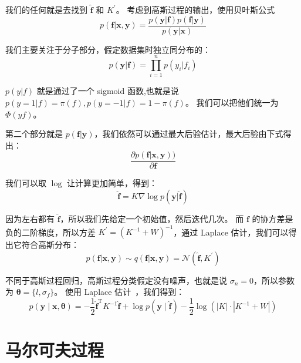 \documentclass[degree=project, degree-type=project]{thuthesis}
\begin{document}
我们的任何就是去找到 $\hat{\boldsymbol{f}}$ 和 $K^\prime$。
考虑到高斯过程的输出，使用贝叶斯公式
\begin{equation}
p(\boldsymbol{f|\boldsymbol{x}, \boldsymbol{y}}) = \frac{p(\boldsymbol{y}|\boldsymbol{f})p(\boldsymbol{f}|\boldsymbol{y})}{p(\boldsymbol{y}|\boldsymbol{x})}
\end{equation}

我们主要关注于分子部分，假定数据集时独立同分布的：
\begin{equation}
p(\boldsymbol{y}|\boldsymbol{f}) = \prod_{i=1}^n p(y_i|f_i)
\end{equation}

$p(y|f)$ 就是通过了一个 sigmoid 函数,也就是说 $p(y=1|f) = \pi(f), p(y=-1|f) = 1 - \pi(f)$。
我们可以把他们统一为 $\Phi(yf)$。

第二个部分就是 $p(\boldsymbol{f}|\boldsymbol{y})$，我们依然可以通过最大后验估计，最大后验由下式得出：
\begin{equation}
\frac{\partial p(\boldsymbol{f}|\boldsymbol{x}, \boldsymbol{y}))}{\partial \boldsymbol{f}}
\end{equation}

我们可以取 $\log$ 让计算更加简单，得到：
\begin{equation}
\hat{\boldsymbol{f}} = K\nabla \log p(\boldsymbol{y}|\hat{\boldsymbol{f}})
\end{equation}

因为左右都有 $\hat{\boldsymbol{f}}$，所以我们先给定一个初始值，然后迭代几次。
而 $\boldsymbol{f}$ 的协方差是负的二阶梯度，所以方差 $K^\prime = (K^{-1} + W)^{-1}$，通过 Laplace 估计，我们可以得出它符合高斯分布：
\begin{equation}
p(\boldsymbol{f}|\boldsymbol{x}, \boldsymbol{y}) \sim q(\boldsymbol{f}|\boldsymbol{x}, \boldsymbol{y}) = \mathcal{N}(\hat{\boldsymbol{f}}, K^\prime)
\end{equation}

不同于高斯过程回归，高斯过程分类假定没有噪声，也就是说 $\sigma_n = 0$，所以参数为 $\boldsymbol{\theta} = \{l, \sigma_f\}$。
使用 Laplace 估计~\cite{gp_book}，我们得到：
\begin{equation}
p(\mathbf{y} \mid \mathbf{x}, \boldsymbol{\theta})=-\frac{1}{2} \hat{\mathbf{f}}^{\mathrm{T}} K^{-1} \hat{\mathbf{f}}+\log p(\mathbf{y} \mid \hat{\mathbf{f}})-\frac{1}{2} \log \left(|K| \cdot\left|K^{-1}+W\right|\right)
\end{equation}

\chapter{马尔可夫过程}
\label{chap:hmm}
\end{document}
